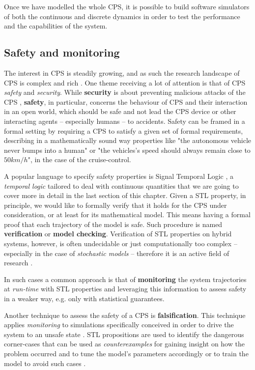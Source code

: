 Once we have modelled the whole CPS, it is possible to build software simulators of both the continuous and discrete dynamics in order to test the performance and the capabilities of the system.

\subsection{Safety and monitoring}

The interest in CPS is steadily growing, and as such the research landscape of CPS is complex and rich \cite{Greer2019CyberPhysicalSA}.
One theme receiving a lot of attention is that of CPS \textit{safety} and \textit{security}.
While \textbf{security} is about preventing malicious attacks of the CPS \cite{cps_sec}, \textbf{safety}, in particular, concerns the behaviour of CPS and their interaction in an open world, which should be safe and not lead the CPS device or other interacting agents -- especially humans -- to accidents. 
Safety can be framed in a formal setting by requiring a CPS to satisfy a given set of formal requirements, describing in a mathematically sound way properties like "the autonomous vehicle never bumps into a human" or "the vehicles's speed should always remain close to $50km/h$", in the case of the cruise-control.

A popular language to specify safety properties is Signal Temporal Logic \cite{stl2004}, a \textit{temporal logic} tailored to deal with continuous quantities that we are going to cover more in detail in the last section of this chapter. 
Given a STL property, in principle, we would like to formally verify that it holds for the CPS under consideration, or at least for its mathematical model.
This means having a formal proof that each trajectory of the model is safe.
Such procedure is named \textbf{verification} or \textbf{model checking}.
Verification of STL properties on hybrid systems, however, is often undecidable or just computationally too complex -- especially in the case of \textit{stochastic models} -- therefore it is an active field of research \cite{Zheng_Julien_2015}.

In such cases a common approach is that of \textbf{monitoring} the system trajectories at \textit{run-time} with STL properties and leveraging this information to assess safety in a weaker way, e.g. only with statistical guarantees. 

Another technique to assess the safety of a CPS is \textbf{falsification}.
This technique applies \textit{monitoring} to simulations specifically conceived in order to drive the system to an unsafe state \cite{cps_falsification}.
STL propositions are used to identify the dangerous corner-cases that can be used as \textit{counterexamples} for gaining insight on how the problem occurred and to tune the model's parameters accordingly \cite{counter-tuning} or to train the model to avoid such cases \cite{counter-train}.



